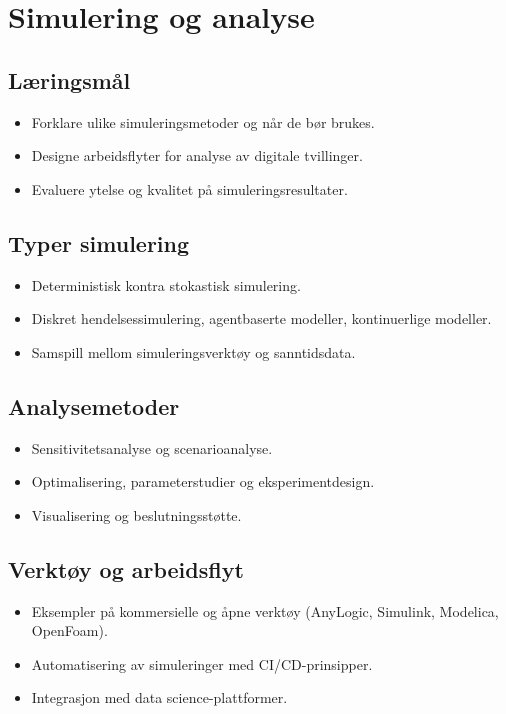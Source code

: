 \chapter{Simulering og analyse}

\section{Læringsmål}
\begin{itemize}
    \item Forklare ulike simuleringsmetoder og når de bør brukes.
    \item Designe arbeidsflyter for analyse av digitale tvillinger.
    \item Evaluere ytelse og kvalitet på simuleringsresultater.
\end{itemize}

\section{Typer simulering}
\begin{itemize}
    \item Deterministisk kontra stokastisk simulering.
    \item Diskret hendelsessimulering, agentbaserte modeller, kontinuerlige modeller.
    \item Samspill mellom simuleringsverktøy og sanntidsdata.
\end{itemize}

\section{Analysemetoder}
\begin{itemize}
    \item Sensitivitetsanalyse og scenarioanalyse.
    \item Optimalisering, parameterstudier og eksperimentdesign.
    \item Visualisering og beslutningsstøtte.
\end{itemize}

\section{Verktøy og arbeidsflyt}
\begin{itemize}
    \item Eksempler på kommersielle og åpne verktøy (AnyLogic, Simulink, Modelica, OpenFoam).
    \item Automatisering av simuleringer med CI/CD-prinsipper.
    \item Integrasjon med data science-plattformer.
\end{itemize}

